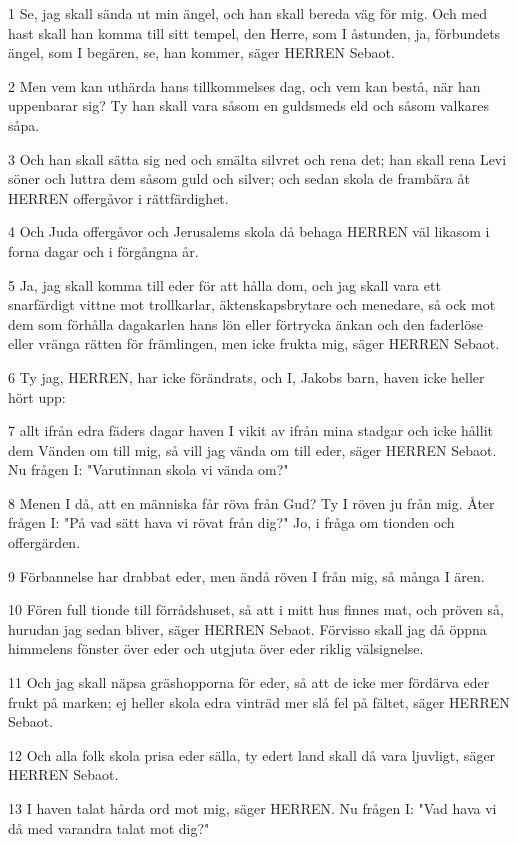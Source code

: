 \par 1 Se, jag skall sända ut min ängel, och han skall bereda väg för mig. Och med hast skall han komma till sitt tempel, den Herre, som I åstunden, ja, förbundets ängel, som I begären, se, han kommer, säger HERREN Sebaot.
\par 2 Men vem kan uthärda hans tillkommelses dag, och vem kan bestå, när han uppenbarar sig? Ty han skall vara såsom en guldsmeds eld och såsom valkares såpa.
\par 3 Och han skall sätta sig ned och smälta silvret och rena det; han skall rena Levi söner och luttra dem såsom guld och silver; och sedan skola de frambära åt HERREN offergåvor i rättfärdighet.
\par 4 Och Juda offergåvor och Jerusalems skola då behaga HERREN väl likasom i forna dagar och i förgångna år.
\par 5 Ja, jag skall komma till eder för att hålla dom, och jag skall vara ett snarfärdigt vittne mot trollkarlar, äktenskapsbrytare och menedare, så ock mot dem som förhålla dagakarlen hans lön eller förtrycka änkan och den faderlöse eller vränga rätten för främlingen, men icke frukta mig, säger HERREN Sebaot.
\par 6 Ty jag, HERREN, har icke förändrats, och I, Jakobs barn, haven icke heller hört upp:
\par 7 allt ifrån edra fäders dagar haven I vikit av ifrån mina stadgar och icke hållit dem Vänden om till mig, så vill jag vända om till eder, säger HERREN Sebaot. Nu frågen I: "Varutinnan skola vi vända om?"
\par 8 Menen I då, att en människa får röva från Gud? Ty I röven ju från mig. Åter frågen I: "På vad sätt hava vi rövat från dig?" Jo, i fråga om tionden och offergärden.
\par 9 Förbannelse har drabbat eder, men ändå röven I från mig, så många I ären.
\par 10 Fören full tionde till förrådshuset, så att i mitt hus finnes mat, och pröven så, hurudan jag sedan bliver, säger HERREN Sebaot. Förvisso skall jag då öppna himmelens fönster över eder och utgjuta över eder riklig välsignelse.
\par 11 Och jag skall näpsa gräshopporna för eder, så att de icke mer fördärva eder frukt på marken; ej heller skola edra vinträd mer slå fel på fältet, säger HERREN Sebaot.
\par 12 Och alla folk skola prisa eder sälla, ty edert land skall då vara ljuvligt, säger HERREN Sebaot.
\par 13 I haven talat hårda ord mot mig, säger HERREN. Nu frågen I: "Vad hava vi då med varandra talat mot dig?"

